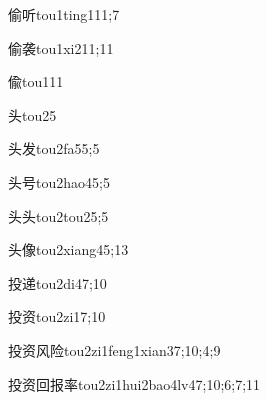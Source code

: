 \begin{verbete}{偷听}{tou1ting1}{11;7}
\end{verbete}

\begin{verbete}{偷袭}{tou1xi2}{11;11}
\end{verbete}

\begin{verbete}{偸}{tou1}{11}
\end{verbete}

\begin{verbete}{头}{tou2}{5}
\end{verbete}

\begin{verbete}{头发}{tou2fa5}{5;5}
\end{verbete}

\begin{verbete}{头号}{tou2hao4}{5;5}
\end{verbete}

\begin{verbete}{头头}{tou2tou2}{5;5}
\end{verbete}

\begin{verbete}{头像}{tou2xiang4}{5;13}
\end{verbete}

\begin{verbete}{投递}{tou2di4}{7;10}
\end{verbete}

\begin{verbete}{投资}{tou2zi1}{7;10}
\end{verbete}

\begin{verbete}{投资风险}{tou2zi1feng1xian3}{7;10;4;9}
\end{verbete}

\begin{verbete}{投资回报率}{tou2zi1hui2bao4lv4}{7;10;6;7;11}
\end{verbete}


